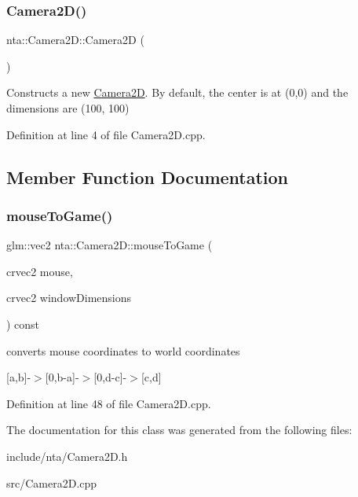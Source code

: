 \subsubsection{\texorpdfstring{Camera2\+D()}{Camera2D()}}
{\footnotesize\ttfamily nta\+::\+Camera2\+D\+::\+Camera2D (\begin{DoxyParamCaption}{ }\end{DoxyParamCaption})}

Constructs a new \hyperlink{classnta_1_1Camera2D}{Camera2D}. By default, the center is at (0,0) and the dimensions are (100, 100) 

Definition at line 4 of file Camera2\+D.\+cpp.



\subsection{Member Function Documentation}
\mbox{\label{classnta_1_1Camera2D_afb20fb9823724babdc8d18b17336169c}} 
\subsubsection{\texorpdfstring{mouse\+To\+Game()}{mouseToGame()}}
{\footnotesize\ttfamily glm\+::vec2 nta\+::\+Camera2\+D\+::mouse\+To\+Game (\begin{DoxyParamCaption}\item[{crvec2}]{mouse,  }\item[{crvec2}]{window\+Dimensions }\end{DoxyParamCaption}) const}



converts mouse coordinates to world coordinates 

\mbox{[}a,b\mbox{]}-\/$>$\mbox{[}0,b-\/a\mbox{]}-\/$>$\mbox{[}0,d-\/c\mbox{]}-\/$>$\mbox{[}c,d\mbox{]} 

Definition at line 48 of file Camera2\+D.\+cpp.



The documentation for this class was generated from the following files\+:\begin{DoxyCompactItemize}
\item 
include/nta/Camera2\+D.\+h\item 
src/Camera2\+D.\+cpp\end{DoxyCompactItemize}
